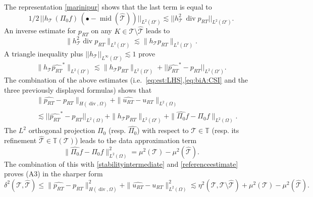 \documentclass{siamltex1213}
\begin{document}
The representation \eqref{marinipur} shows that the last term is equal to
\[
	1/2 \,  ||  h_{\mathcal{T}}  \, (\Pi_0 f)\, (\bullet -{\operatorname{mid}({\hat{\mathcal{T}}})})  ||_{L^2(\Omega')}
\lesssim  ||  h_{\mathcal{T}}^2 \,\operatorname{div} p_{RT}  ||_{L^2(\Omega')}.
\]
An inverse estimate for  $ {p_{RT}}$ on any $K\in{\mathcal{T}}\setminus{\hat{\mathcal{T}}}$ leads to 
\[
 \|  h_{\mathcal{T}}^2  \operatorname{div} p_{RT} \|_{L^2(\Omega')} \lesssim  \|  h_{\mathcal{T}}  p_{RT} \|_{L^2(\Omega')}.
\]
A triangle inequality plus  $||  h_{\mathcal{T}} ||_{L^\infty(\Omega')}\lesssim 1$ prove
\[
 \|  h_{\mathcal{T}}  {\widehat{p_{RT}}}^* \|_{L^2(\Omega')}\lesssim  
  \|  h_{\mathcal{T}}  {p_{RT}} \|_{L^2(\Omega')}
 +||  {\widehat{p_{RT}}}^*-p_{RT}  ||_{L^2(\Omega')}.
\]
The combination of the above estimates (i.e.\ \eqref{eq:est:LHS},\eqref{eq:biA:CSI} and the three previously displayed formulas) shows that
\begin{eqnarray}\label{referenceestimate}
&&\| {\widehat{p_{RT}}}-{p_{RT}}\|_{H(\operatorname{div},\Omega)} +\| {\widehat{u_{RT}}}-u_{RT} \|_{L^2(\Omega)}\\ 
\nonumber
&& \lesssim   ||  {\widehat{p_{RT}}}^*-p_{RT}  ||_{L^2(\Omega)}+ \|  h_{\mathcal{T}}  {p_{RT}} \|_{L^2(\Omega')}
+ \|\widehat{\Pi_0} f-\Pi_0 f\|_{L^2(\Omega)}.
\end{eqnarray}
The $L^2$ orthogonal projection $\Pi_0$ (resp. $\widehat{\Pi_0}$) with respect to ${\mathcal{T}}\in{\mathbb T}$
 (resp. its refinement ${\hat{\mathcal{T}}}\in{\mathbb T}({\mathcal{T}})$) leads to the data approximation term  
 \[
 \|\widehat{\Pi_0} f-\Pi_0 f\|_{L^2(\Omega)}^2= \mu^2({\mathcal{T}})-\mu^2({\hat{\mathcal{T}}}).
 \]
The combination of this with \eqref{stabilityintermediate} and \eqref{referenceestimate} proves (A3) in the sharper form
\[
\delta^2({\mathcal{T}},{\hat{\mathcal{T}}})\le \| {\widehat{p_{RT}}}-{p_{RT}}\|_{H(\operatorname{div},\Omega)}^2 +\| {\widehat{u_{RT}}}-u_{RT} \|_{L^2(\Omega)}^2
\lesssim \eta^2({\mathcal{T}},{\mathcal{T}}\setminus{\hat{\mathcal{T}}})+  \mu^2({\mathcal{T}})-\mu^2({\hat{\mathcal{T}}}).
\]
\end{document}
